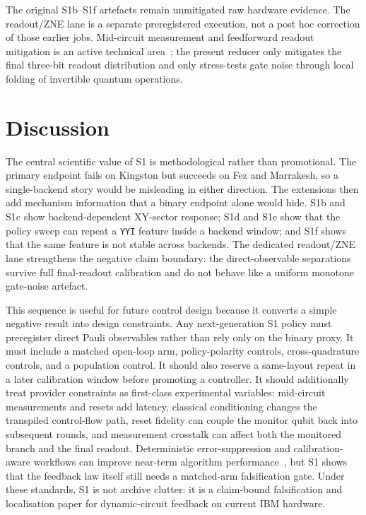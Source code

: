 \documentclass[preprint,aps,physrev,superscriptaddress,floatfix,longbibliography]{revtex4-2}
\begin{document}
The original S1b--S1f artefacts remain unmitigated raw hardware evidence. The
readout/ZNE lane is a separate preregistered execution, not a post hoc
correction of those earlier jobs. Mid-circuit measurement and feedforward
readout mitigation is an active technical area~\cite{KohKohThompson2026};
the present reducer only mitigates the final three-bit readout distribution
and only stress-tests gate noise through local folding of invertible quantum
operations.

\section{Discussion}

The central scientific value of S1 is methodological rather than promotional.
The primary endpoint fails on Kingston but succeeds on Fez and Marrakesh, so a
single-backend story would be misleading in either direction. The extensions
then add mechanism information that a binary endpoint alone would hide. S1b
and S1c show backend-dependent XY-sector response; S1d and S1e show that the
policy sweep can repeat a \texttt{YYI} feature inside a backend window; and
S1f shows that the same feature is not stable across backends. The dedicated
readout/ZNE lane strengthens the negative claim boundary: the
direct-observable separations survive full final-readout calibration and do
not behave like a uniform monotone gate-noise artefact.

This sequence is useful for future control design because it converts a
simple negative result into design constraints. Any next-generation S1 policy
must preregister direct Pauli observables rather than rely only on the binary
proxy. It must include a matched open-loop arm, policy-polarity controls,
cross-quadrature controls, and a population control. It should also reserve a
same-layout repeat in a later calibration window before promoting a
controller. It should additionally treat provider constraints as first-class
experimental variables: mid-circuit measurements and resets add latency,
classical conditioning changes the transpiled control-flow path, reset
fidelity can couple the monitor qubit back into subsequent rounds, and
measurement crosstalk can affect both the monitored branch and the final
readout. Deterministic error-suppression and calibration-aware workflows can
improve near-term algorithm performance~\cite{Mundada2023}, but S1 shows that
the feedback law itself still needs a matched-arm falsification gate. Under
these standards, S1 is not archive clutter: it is a claim-bound falsification
and localisation paper for dynamic-circuit feedback on current IBM hardware.
\end{document}
